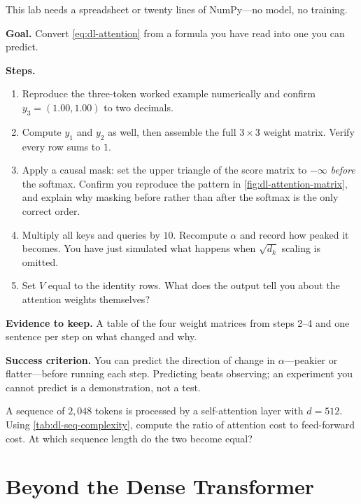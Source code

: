 \begin{practicallab}
This lab needs a spreadsheet or twenty lines of NumPy---no model, no training.

\textbf{Goal.} Convert \cref{eq:dl-attention} from a formula you have read into
one you can predict.

\textbf{Steps.}
\begin{enumerate}
  \item Reproduce the three-token worked example numerically and confirm
        $y_3 = (1.00, 1.00)$ to two decimals.
  \item Compute $y_1$ and $y_2$ as well, then assemble the full $3\times3$
        weight matrix. Verify every row sums to $1$.
  \item Apply a causal mask: set the upper triangle of the score matrix to
        $-\infty$ \emph{before} the softmax. Confirm you reproduce the pattern
        in \cref{fig:dl-attention-matrix}, and explain why masking before
        rather than after the softmax is the only correct order.
  \item Multiply all keys and queries by $10$. Recompute $\alpha$ and record
        how peaked it becomes. You have just simulated what happens when
        $\sqrt{d_k}$ scaling is omitted.
  \item Set $V$ equal to the identity rows. What does the output tell you about
        the attention weights themselves?
\end{enumerate}

\textbf{Evidence to keep.} A table of the four weight matrices from steps 2--4
and one sentence per step on what changed and why.

\textbf{Success criterion.} You can predict the direction of change in
$\alpha$---peakier or flatter---before running each step. Predicting beats
observing; an experiment you cannot predict is a demonstration, not a test.
\end{practicallab}

\begin{checkpoint}
A sequence of $2{,}048$ tokens is processed by a self-attention layer with
$d=512$. Using \cref{tab:dl-seq-complexity}, compute the ratio of attention
cost to feed-forward cost. At which sequence length do the two become equal?
\end{checkpoint}

\section{Beyond the Dense Transformer}
\label{sec:dl-beyond-transformer}

